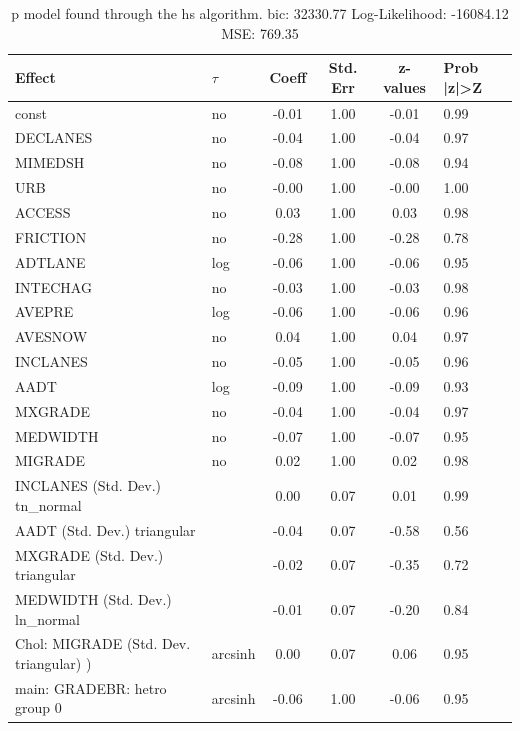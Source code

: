 \begin{table}
	\caption{p model found through the hs algorithm. bic: 32330.77 Log-Likelihood: -16084.12 MSE: 769.35}
	\begin{center}
		\begin{tabular}{|l|l|c|c|c|l|}
			\hline
			Effect & $\tau$ & Coeff & Std. Err & z-values & Prob |z|>Z \\
			\hline
			const & no & -0.01 & 1.00 & -0.01 & 0.99 \\
			\hline
			DECLANES & no & -0.04 & 1.00 & -0.04 & 0.97 \\
			\hline
			MIMEDSH & no & -0.08 & 1.00 & -0.08 & 0.94 \\
			\hline
			URB & no & -0.00 & 1.00 & -0.00 & 1.00 \\
			\hline
			ACCESS & no & 0.03 & 1.00 & 0.03 & 0.98 \\
			\hline
			FRICTION & no & -0.28 & 1.00 & -0.28 & 0.78 \\
			\hline
			ADTLANE & log & -0.06 & 1.00 & -0.06 & 0.95 \\
			\hline
			INTECHAG & no & -0.03 & 1.00 & -0.03 & 0.98 \\
			\hline
			AVEPRE & log & -0.06 & 1.00 & -0.06 & 0.96 \\
			\hline
			AVESNOW & no & 0.04 & 1.00 & 0.04 & 0.97 \\
			\hline
			INCLANES & no & -0.05 & 1.00 & -0.05 & 0.96 \\
			\hline
			AADT & log & -0.09 & 1.00 & -0.09 & 0.93 \\
			\hline
			MXGRADE & no & -0.04 & 1.00 & -0.04 & 0.97 \\
			\hline
			MEDWIDTH & no & -0.07 & 1.00 & -0.07 & 0.95 \\
			\hline
			MIGRADE & no & 0.02 & 1.00 & 0.02 & 0.98 \\
			\hline
			INCLANES (Std. Dev.) tn_normal &  & 0.00 & 0.07 & 0.01 & 0.99 \\
			\hline
			AADT (Std. Dev.) triangular &  & -0.04 & 0.07 & -0.58 & 0.56 \\
			\hline
			MXGRADE (Std. Dev.) triangular &  & -0.02 & 0.07 & -0.35 & 0.72 \\
			\hline
			MEDWIDTH (Std. Dev.) ln_normal &  & -0.01 & 0.07 & -0.20 & 0.84 \\
			\hline
			 Chol: MIGRADE (Std. Dev. triangular) ) & arcsinh & 0.00 & 0.07 & 0.06 & 0.95 \\
			\hline
			main: GRADEBR: hetro group 0 & arcsinh & -0.06 & 1.00 & -0.06 & 0.95 \\

\end{tabular}
\end{center}
\end{table}
